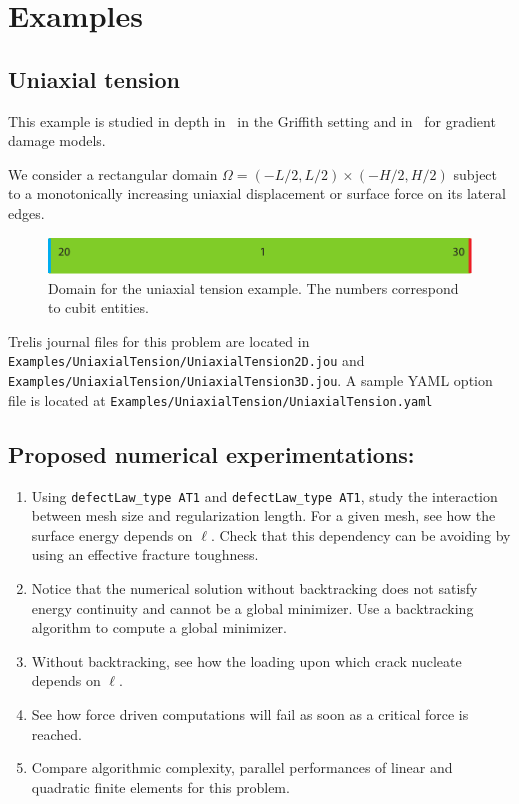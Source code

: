 \documentclass[10pt,oneside]{report}
\begin{document}
\chapter{Examples}
\section{Uniaxial tension}
This example is studied in depth in~\cite[Section 3.1]{Bourdin-Francfort-EtAl-2008b} in the Griffith setting and in~\cite{Pham-Amor-EtAl-2011a} for gradient damage models.


We consider a rectangular domain $\Omega = (-L/2,L/2) \times (-H/2,H/2)$ subject to a monotonically increasing uniaxial displacement or surface force on its lateral edges. 


\begin{figure}[H]
\centering
	\includegraphics[width = \textwidth]{Examples/UniaxialTension/Geometry.pdf}
\caption{Domain for the uniaxial tension example. The numbers correspond to cubit entities.}
\label{fig:Uniaxial}
\end{figure}

Trelis journal files for this problem are located in \verb+Examples/UniaxialTension/UniaxialTension2D.jou+ and \verb+Examples/UniaxialTension/UniaxialTension3D.jou+. A sample YAML option file is located at \verb+Examples/UniaxialTension/UniaxialTension.yaml+

\section*{Proposed numerical experimentations:}
\begin{enumerate}
	\item	Using \verb+defectLaw_type AT1+ and \verb+defectLaw_type AT1+, study the interaction between mesh size and regularization length. For a given mesh, see how the surface energy depends on $\ell$. Check that this dependency can be avoiding by using an effective fracture toughness.
	\item Notice that the numerical solution without backtracking does not satisfy energy continuity and cannot be a global minimizer. Use a backtracking algorithm to compute a global minimizer.
	\item Without backtracking, see how the loading upon which crack nucleate depends on $\ell$.
	\item See how force driven computations will fail as soon as a critical force is reached.
	\item Compare algorithmic complexity, parallel performances of linear and quadratic finite elements for this problem.
\end{enumerate}
\end{document}
